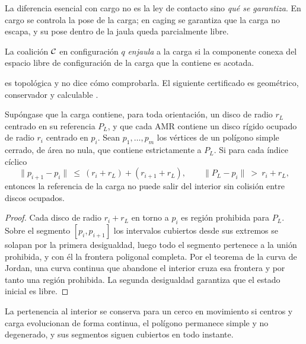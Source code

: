 La diferencia esencial con \textsf{cargo} no es la ley de contacto sino
\emph{qué se garantiza}. En \textsf{cargo} se controla la pose de la carga; en
\textsf{caging} se garantiza que la carga no escapa, y su pose dentro de la
jaula queda parcialmente libre.

\begin{definicion}[Jaula]
\label{def:jaula}
La coalición $\mathcal{C}$ en configuración $q$ \emph{enjaula} a la carga si la
componente conexa del espacio libre de configuración de la carga que la contiene
es acotada.
\end{definicion}

 es topológica y no dice cómo comprobarla. El siguiente
certificado es geométrico, conservador y calculable \cite{mayorga2026m1}.

\begin{teorema}
\label{th:cerco}
Supóngase que la carga contiene, para toda orientación, un disco de radio $r_L$
centrado en su referencia $P_L$, y que cada AMR contiene un disco rígido ocupado
de radio $r_i$ centrado en $p_i$. Sean $p_1,\dots,p_m$ los vértices de un
polígono simple cerrado, de área no nula, que contiene estrictamente a $P_L$. Si
para cada índice cíclico
\[
  \lVert p_{i+1}-p_i\rVert\ \le\ (r_i+r_L)+(r_{i+1}+r_L),
  \qquad
  \lVert P_L-p_i\rVert\ >\ r_i+r_L ,
\]
entonces la referencia de la carga no puede salir del interior sin colisión entre
discos ocupados.
\end{teorema}

\begin{proof}
Cada disco de radio $r_i+r_L$ en torno a $p_i$ es región prohibida para $P_L$.
Sobre el segmento $[p_i,p_{i+1}]$ los intervalos cubiertos desde sus extremos se
solapan por la primera desigualdad, luego todo el segmento pertenece a la unión
prohibida, y con él la frontera poligonal completa. Por el teorema de la curva de
Jordan, una curva continua que abandone el interior cruza esa frontera y por
tanto una región prohibida. La segunda desigualdad garantiza que el estado
inicial es libre.
\end{proof}

\begin{corolario}
\label{co:cerco-movil}
La pertenencia al interior se conserva para un cerco en movimiento si centros y
carga evolucionan de forma continua, el polígono permanece simple y no
degenerado, y sus segmentos siguen cubiertos en todo instante.
\end{corolario}

